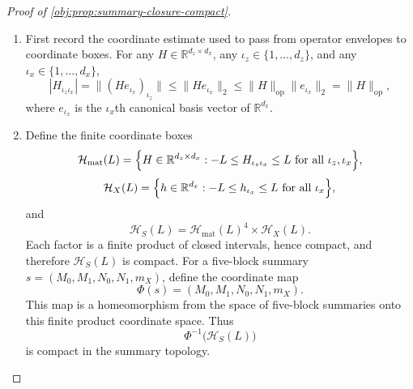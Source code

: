 \begin{proof}[Proof of \cref{obj:prop:summary-closure-compact}]
\begin{enumerate}
\item First record the coordinate estimate used to pass from operator envelopes to coordinate boxes.  For any \(H\in\mathbb R^{d_z\times d_x}\), any \(\iota_z\in\{1,\ldots,d_z\}\), and any \(\iota_x\in\{1,\ldots,d_x\}\),
\[
        |H_{\iota_z\iota_x}|
        =
        \|(H e_{\iota_x})_{\iota_z}\|
        \le
        \|H e_{\iota_x}\|_2
        \le
        \|H\|_{\mathrm{op}}\|e_{\iota_x}\|_2
        =
        \|H\|_{\mathrm{op}},
\]
where \(e_{\iota_x}\) is the \(\iota_x\)th canonical basis vector of \(\mathbb R^{d_x}\). %

\item Define the finite coordinate boxes
\[
\mathcal H_{\mathrm{mat}}(L)
=
\Bigl\{H\in\mathbb R^{d_z\times d_x}:
        -L\le H_{\iota_z\iota_x}\le L
        \text{ for all }\iota_z,\iota_x\Bigr\},
\]
\[
\mathcal H_X(L)
=
\Bigl\{h\in\mathbb R^{d_x}:
        -L\le h_{\iota_x}\le L
        \text{ for all }\iota_x\Bigr\},
\]
and
\[
\mathcal H_S(L)
=
\mathcal H_{\mathrm{mat}}(L)^4\times \mathcal H_X(L).
\]
Each factor is a finite product of closed intervals, hence compact, and therefore \(\mathcal H_S(L)\) is compact.  For a five-block summary \(s=(M_0,M_1,N_0,N_1,m_X)\), define the coordinate map
\[
        \Phi(s)=(M_0,M_1,N_0,N_1,m_X).
\]
This map is a homeomorphism from the space of five-block summaries onto this finite product coordinate space.  Thus
\[
        \Phi^{-1}\bigl(\mathcal H_S(L)\bigr)
\]
is compact in the summary topology. %


\end{enumerate}
\end{proof}
